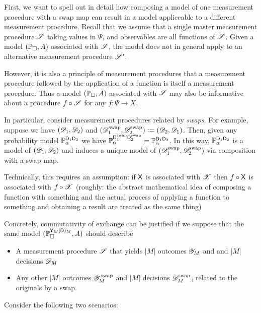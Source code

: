 First, we want to spell out in detail how composing a model of one measurement procedure with a swap map can result in a model appliccable to a different measurement procedure. Recall that we assume that a single master measurement procedure $\mathscr{S}$ taking values in $\Psi$, and observables are all functions of $\mathscr{S}$. Given a model $(\mathbb{P}_\square,A)$ associated with $\mathscr{S}$, the model does not in general apply to an alternative measurement procedure $\mathscr{S}'$.

However, it is also a principle of measurement procedures that a measurement procedure followed by the application of a function is itself a measurement procedure. Thus a model $(\mathbb{P}_\square,A)$ associated with $\mathscr{S}$ may also be informative about a procedure $f\circ \mathscr{S}$ for any $f:\Psi\to X$.

In particular, consider measurement procedures related by \emph{swaps}. For example, suppose we have $(\mathscr{D}_1,\mathscr{D}_2)$ and $(\mathscr{D}^{\text{swap}}_1,\mathscr{D}^{\text{swap}}_2):=(\mathscr{D}_2,\mathscr{D}_1)$. Then, given any probability model $\mathbb{P}_\alpha^{\mathsf{D}_1\mathsf{D}_2}$ we have $\mathbb{P}_\alpha^{\mathsf{D}_1^{\text{swap}}\mathsf{D}_2^{\text{swap}}} = \mathbb{P}_\alpha^{\mathsf{D}_1\mathsf{D}_2}$. In this way, $\mathbb{P}_\alpha^{\mathsf{D}_1\mathsf{D}_2}$ is a model of $(\mathscr{D}_1,\mathscr{D}_2)$ and induces a unique model of $(\mathscr{D}^{\text{swap}}_1,\mathscr{D}^{\text{swap}}_2)$ via composition with a swap map.

Technically, this requires an assumption: if $\mathsf{X}$ is associated with $\mathscr{X}$ then $f\circ \mathsf{X}$ is associated with $f\circ \mathscr{X}$ (roughly: the abstract mathematical idea of composing a function with something and the actual process of applying a function to something and obtaining a result are treated as the same thing)

Concretely, commutativity of exchange can be justified if we suppose that the same model $(\mathbb{P}_\square^{\mathsf{Y}_M|\mathsf{D})_M},A)$ should describe
\begin{itemize}
    \item A measurement procedure $\mathscr{S}$ that yields $|M|$ outcomes $\mathscr{Y}_M$ and and $|M|$ decisions $\mathscr{D}_M$
    \item Any other $|M|$ outcomes $\mathscr{Y}^{\text{swap}}_M$ and $|M|$ decisions $\mathscr{D}^{\text{swap}}_M$, related to the originals by a swap.
\end{itemize}

Consider the following two scenarios:

